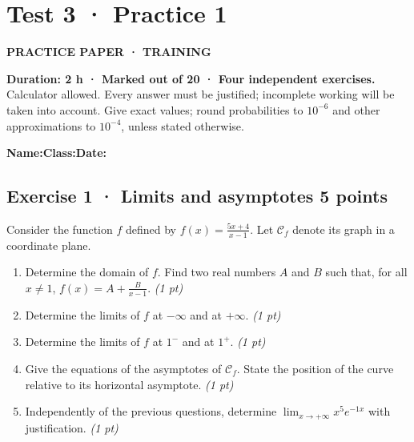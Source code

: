 \clearpage{}\label{sujet:4-1}

\section*{Test 3 · Practice 1}

{\sffamily\bfseries\color{teal}PRACTICE PAPER · TRAINING\par}

\textbf{Duration: 2 h · Marked out of 20 · Four independent exercises.}\\Calculator allowed. Every answer must be justified; incomplete working will be taken into account. Give exact values; round probabilities to $10^{-6}$ and other approximations to $10^{-4}$, unless stated otherwise.

\smallskip\textbf{Name:}\enspace\dotfill\quad\textbf{Class:}\enspace\dotfill\quad\textbf{Date:}\enspace\dotfill

\subsection*{Exercise 1 · Limits and asymptotes \hfill 5 points}Consider the function $f$ defined by $f(x)=\frac{5x+4}{x-1}$. Let $\mathcal C_f$ denote its graph in a coordinate plane.

\begin{enumerate}

\item Determine the domain of $f$. Find two real numbers $A$ and $B$ such that, for all $x\ne1$, $f(x)=A+\frac B{x-1}$. \hfill\textit{(1 pt)}

\item Determine the limits of $f$ at $-\infty$ and at $+\infty$. \hfill\textit{(1 pt)}

\item Determine the limits of $f$ at $1^-$ and at $1^+$. \hfill\textit{(1 pt)}

\item Give the equations of the asymptotes of $\mathcal C_f$. State the position of the curve relative to its horizontal asymptote. \hfill\textit{(1 pt)}

\item Independently of the previous questions, determine $\displaystyle\lim_{x\to+\infty}x^{5}e^{-1x}$ with justification. \hfill\textit{(1 pt)}

\end{enumerate}

